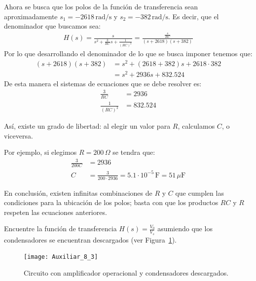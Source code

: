 \documentclass[
  11pt,
  letterpaper,
   addpoints,
   answers
  ]{exam}
\begin{document}
\begin{questions}
\begin{solution}
\begin{itemize}
Ahora se busca que los polos de la función de transferencia sean aproximadamente \( s_1 = -2618\,\mathrm{rad/s} \) y \( s_2 = -382\,\mathrm{rad/s} \). Es decir, que el denominador que buscamos sea:
\begin{align}
  H(s)= \frac{s}{s^2 + \frac{3}{RC}s + \frac{1}{(RC)^2}}= \frac{\frac{s}{RC}}{(s + 2618)(s + 382)}
\end{align}
Por lo que desarrollando el denominador de lo que se busca imponer tenemos que:
\begin{align}
    (s + 2618)(s + 382) &= s^2 + (2618 + 382)s + 2618 \cdot 382 \\
    &= s^2 + 2936s + 832.524
\end{align}
De esta manera el sistemas de ecuaciones que se debe resolver es:
\begin{align}
    \frac{3}{RC} &= 2936 \\
    \frac{1}{(RC)^2} &= 832.524
\end{align}

Así, existe un grado de libertad: al elegir un valor para \( R \), calculamos \( C \), o viceversa.

Por ejemplo, si elegimos \( R = 200\,\Omega \) se tendra que:
\begin{align}
    \frac{3}{200C} &= 2936 \\
    C &= \frac{3}{200 \cdot 2936} = 5.1 \cdot 10^{-5}\,\mathrm{F} = 51\,\mu\mathrm{F}
\end{align}

En conclusión, existen infinitas combinaciones de \( R \) y \( C \) que cumplen las condiciones para la ubicación de los polos; basta con que los productos \( RC \) y \( R \) respeten las ecuaciones anteriores.
\end{itemize}
\end{solution}

\question Encuentre la función de transferencia \( H(s) = \frac{V_0}{V_s} \) asumiendo que los condensadores se encuentran descargados (ver Figura~\ref{fig:opamp-filtro}).

\begin{figure}[h!]
    \centering
    \texttt{[image: Auxiliar\_8\_3]}
    \caption{Circuito con amplificador operacional y condensadores descargados.}
    \label{fig:opamp-filtro}
\end{figure}


\end{questions}
\end{document}
